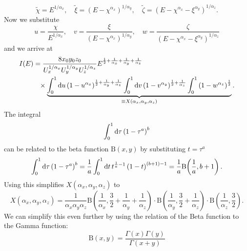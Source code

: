 \begin{equation*}
    \tilde{\chi} = E^{1/\alpha_x}, \quad \tilde{\xi} = \left(E - \chi^{\alpha_x}\right)^{1/\alpha_y}, \quad \tilde{\zeta} = \left(E - \chi^{\alpha_x} - \xi^{\alpha_y}\right)^{1/\alpha_z}.
\end{equation*}
Now we substitute
\begin{equation*}
    u = \frac{\chi}{E^{1/\alpha_x}}, \quad v = \frac{\xi}{\left(E - \chi^{\alpha_x}\right)^{1/\alpha_y}}, \quad w = \frac{\zeta}{\left(E - \chi^{\alpha_x} - \xi^{\alpha_y}\right)^{1/\alpha_z}}
\end{equation*}
and we arrive at
\begin{align*}
    I(E) &= \frac{8 x_0 y_0 z_0}{U_x^{1/\alpha_x} U_y^{1/\alpha_y} U_z^{1/\alpha_z}} E^{\frac{1}{2} + \frac{1}{\alpha_x} + \frac{1}{\alpha_y} + \frac{1}{\alpha_z}} \\
    &\phantom{=} \times \underbrace{\int_0^1 \text{d}u \left(1 - u^{\alpha_x}\right)^{\frac{1}{2} + \frac{1}{\alpha_y} + \frac{1}{\alpha_z}} \int_0^1 \text{d}v \left(1 - v^{\alpha_y}\right)^{\frac{1}{2} + \frac{1}{\alpha_z}} \int_0^1 \left(1 - w^{\alpha_z}\right)^\frac{1}{2}}_{\equiv X(\alpha_x,\alpha_y,\alpha_z)}.
\end{align*}
The integral
\[
    \int_0^1 \text{d}\tau \left(1 - \tau^a\right)^b 
\]
can be related to the beta function $\text{B}(x,y)$ by substituting $t = \tau^a$
\begin{equation*}
    \int_0^1 \text{d}\tau \left(1 - \tau^a\right)^b = \frac{1}{a} \int_0^1 \text{d}t\, t^{\frac{1}{a} - 1} \left(1 - t\right)^{(b + 1) - 1} =\frac{1}{a} \text{B}\!\left(\frac{1}{a}, b + 1\right).
\end{equation*}
Using this simplifies $X(\alpha_x,\alpha_y,\alpha_z)$ to 
\begin{equation*}
    X(\alpha_x,\alpha_y,\alpha_z) = \frac{1}{\alpha_x \alpha_y \alpha_z} \text{B}\!\left(\frac{1}{\alpha_x}, \frac{3}{2} + \frac{1}{\alpha_y} + \frac{1}{\alpha_z} \right) \cdot \text{B}\!\left(\frac{1}{\alpha_y}, \frac{3}{2} + \frac{1}{\alpha_z} \right) \cdot \text{B}\!\left(\frac{1}{\alpha_z}, \frac{3}{2}\right).
\end{equation*}
We can simplify this even further by using the relation of the Beta function to the Gamma function:
\begin{equation*}
    \text{B}(x,y) = \frac{\Gamma(x)\Gamma(y)}{\Gamma(x + y)}
\end{equation*}
